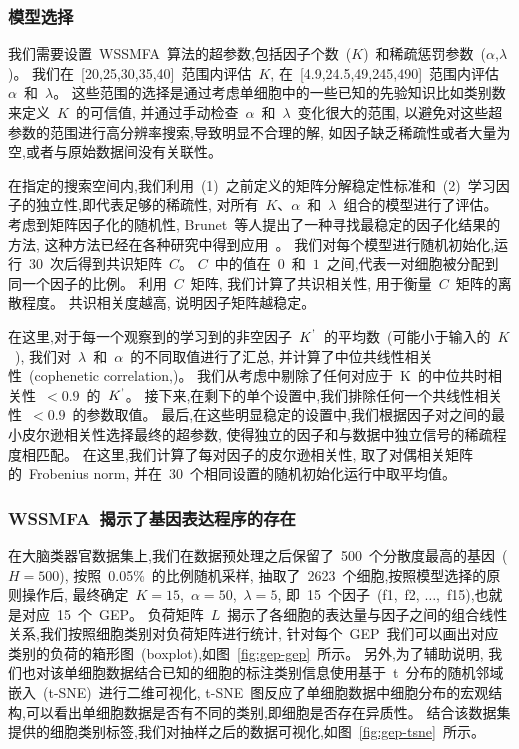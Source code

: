 \subsubsection{模型选择}
我们需要设置~WSSMFA~算法的超参数,包括因子个数~($K$)~和稀疏惩罚参数~($\alpha$,$\lambda$)。
我们在~[20,25,30,35,40]~范围内评估~$K$, 在~[4.9,24.5,49,245,490]~范围内评估~$\alpha$~和~$\lambda$。
这些范围的选择是通过考虑单细胞中的一些已知的先验知识比如类别数来定义~$K$~的可信值,
并通过手动检查~$\alpha$~和~$\lambda$~变化很大的范围,
以避免对这些超参数的范围进行高分辨率搜索,导致明显不合理的解,
如因子缺乏稀疏性或者大量为空,或者与原始数据间没有关联性。

在指定的搜索空间内,我们利用~(1)~之前定义的矩阵分解稳定性标准和~(2)~学习因子的独立性,即代表足够的稀疏性,
对所有~$K$、$\alpha$~和~$\lambda$~组合的模型进行了评估。
考虑到矩阵因子化的随机性, Brunet~等人提出了一种寻找最稳定的因子化结果的方法,
这种方法已经在各种研究中得到应用~\cite{brunet2004metagenes,wu2016stability}。
我们对每个模型进行随机初始化,运行~30~次后得到共识矩阵~$C$。
$C$~中的值在~$0$~和~$1$~之间,代表一对细胞被分配到同一个因子的比例。
利用~$C$~矩阵, 我们计算了共识相关性, 用于衡量~$C$~矩阵的离散程度。
共识相关度越高, 说明因子矩阵越稳定。

在这里,对于每一个观察到的学习到的非空因子~$K^\textup{'}$~的平均数~(可能小于输入的~$K$~),
我们对~$\lambda$~和~$\alpha$~的不同取值进行了汇总,
并计算了中位共线性相关性~(cophenetic correlation,\cite{brunet2004metagenes})。
我们从考虑中剔除了任何对应于~K~的中位共时相关性~$< 0.9$~的~$K^\textup{'}$。
接下来,在剩下的单个设置中,我们排除任何一个共线性相关性~$< 0.9$~的参数取值。
最后,在这些明显稳定的设置中,我们根据因子对之间的最小皮尔逊相关性选择最终的超参数,
使得独立的因子和与数据中独立信号的稀疏程度相匹配。
在这里,我们计算了每对因子的皮尔逊相关性, 取了对偶相关矩阵的~Frobenius norm, 
并在~30~个相同设置的随机初始化运行中取平均值。

\subsubsection{WSSMFA~揭示了基因表达程序的存在}

在大脑类器官数据集上,我们在数据预处理之后保留了~500~个分散度最高的基因~($H = 500$),
按照~0.05\%~的比例随机采样, 抽取了~2623~个细胞,按照模型选择的原则操作后,
最终确定~$K = 15$,~$\alpha = 50$,~$\lambda = 5$, 
即~15~个因子~(f1,~f2, $\ldots$,~f15),也就是对应~15~个~GEP。
负荷矩阵~$L$~揭示了各细胞的表达量与因子之间的组合线性关系,我们按照细胞类别对负荷矩阵进行统计,
针对每个~GEP~我们可以画出对应类别的负荷的箱形图~(boxplot),如图~\ref{fig:gep-gep}~所示。
另外,为了辅助说明, 我们也对该单细胞数据结合已知的细胞的标注类别信息使用基于~t~分布的随机邻域嵌入~(t-SNE)~进行二维可视化,
t-SNE~图反应了单细胞数据中细胞分布的宏观结构,可以看出单细胞数据是否有不同的类别,即细胞是否存在异质性。
结合该数据集提供的细胞类别标签,我们对抽样之后的数据可视化,如图~\ref{fig:gep-tsne}~所示。

